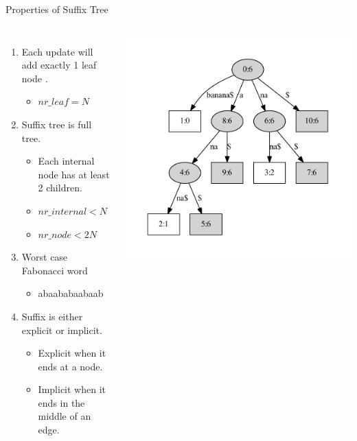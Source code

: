 \begin{frame}[shrink=10]{Properties of Suffix Tree}
\begin{columns}
\begin{enumerate}
\item Each update will add exactly 1 leaf node .
\begin{itemize}
\item $nr\_leaf = N$
\end{itemize}
\item Suffix tree is full tree. 
\begin{itemize}
\item Each internal node has at least 2 children.
\item $nr\_internal < N$
\item $nr\_node < 2 N$
\end{itemize}
\item Worst case Fabonacci word 
\begin{itemize}
\item abaababaabaab
\end{itemize}
\item Suffix is either explicit or implicit.
\begin{itemize}
\item Explicit when it ends at a node.
\item Implicit when it ends in the middle of an edge.
\end{itemize}
\end{enumerate}
\includegraphics[width=\textwidth,trim=50pt 50pt 50pt 50pt]{banana-st.pdf}
\end{columns}

\end{frame}


